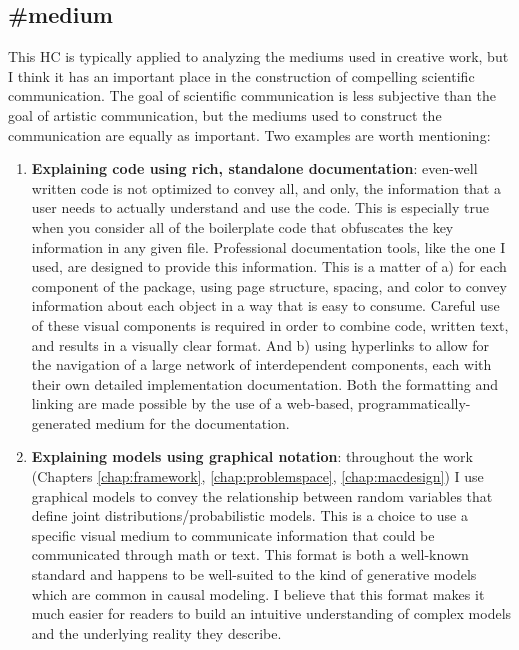 \documentclass[./main.tex]{subfiles}
\begin{document}

\subsection*{\textbf{\#medium}}
\label{hc:medium}

This HC is typically applied to analyzing the mediums used in creative work, but I think it has an important place in the construction of compelling scientific communication. The goal of scientific communication is less subjective than the goal of artistic communication, but the mediums used to construct the communication are equally as important. Two examples are worth mentioning:

\begin{enumerate}
    \item \textbf{Explaining code using rich, standalone documentation}: even-well written code is not optimized to convey all, and only, the information that a user needs to actually understand and use the code. This is especially true when you consider all of the boilerplate code that obfuscates the key information in any given file. Professional documentation tools, like the one I used, are designed to provide this information. This is a matter of a) for each component of the package, using page structure, spacing, and color to convey information about each object in a way that is easy to consume. Careful use of these visual components is required in order to combine code, written text, and results in a visually clear format. And b) using hyperlinks to allow for the navigation of a large network of interdependent components, each with their own detailed implementation documentation. Both the formatting and linking are made possible by the use of a web-based, programmatically-generated medium for the documentation.
    
    \item \textbf{Explaining models using graphical notation}: throughout the work (Chapters \ref{chap:framework}, \ref{chap:problemspace}, \ref{chap:macdesign}) I use graphical models to convey the relationship between random variables that define joint distributions/probabilistic models. This is a choice to use a specific visual medium to communicate information that could be communicated through math or text. This format is both a well-known standard and happens to be well-suited to the kind of generative models which are common in causal modeling. I believe that this format makes it much easier for readers to build an intuitive understanding of complex models and the underlying reality they describe.
\end{enumerate}
\end{document}
